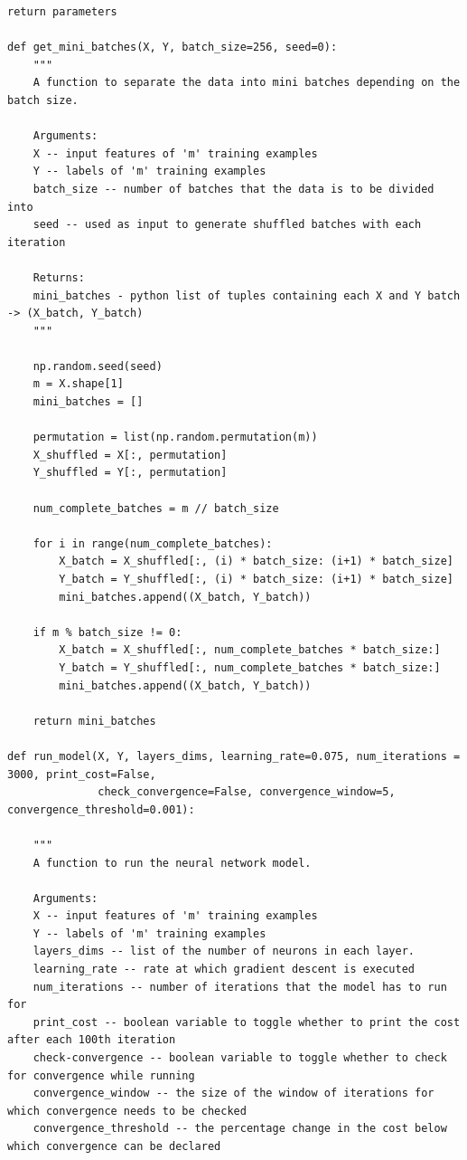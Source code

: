 \documentclass{article}
\begin{document}
\begin{lstlisting}[caption={Neural network functions - NN\_helper\_functions.py}]
    return parameters

def get_mini_batches(X, Y, batch_size=256, seed=0):
    """
    A function to separate the data into mini batches depending on the batch size.

    Arguments:
    X -- input features of 'm' training examples
    Y -- labels of 'm' training examples
    batch_size -- number of batches that the data is to be divided into
    seed -- used as input to generate shuffled batches with each iteration

    Returns:
    mini_batches - python list of tuples containing each X and Y batch -> (X_batch, Y_batch)
    """
    
    np.random.seed(seed)
    m = X.shape[1]
    mini_batches = []

    permutation = list(np.random.permutation(m))
    X_shuffled = X[:, permutation]
    Y_shuffled = Y[:, permutation]

    num_complete_batches = m // batch_size

    for i in range(num_complete_batches):
        X_batch = X_shuffled[:, (i) * batch_size: (i+1) * batch_size]
        Y_batch = Y_shuffled[:, (i) * batch_size: (i+1) * batch_size]
        mini_batches.append((X_batch, Y_batch))

    if m % batch_size != 0:
        X_batch = X_shuffled[:, num_complete_batches * batch_size:]
        Y_batch = Y_shuffled[:, num_complete_batches * batch_size:]
        mini_batches.append((X_batch, Y_batch))
    
    return mini_batches

def run_model(X, Y, layers_dims, learning_rate=0.075, num_iterations = 3000, print_cost=False,
              check_convergence=False, convergence_window=5, convergence_threshold=0.001):
    
    """
    A function to run the neural network model.

    Arguments:
    X -- input features of 'm' training examples
    Y -- labels of 'm' training examples
    layers_dims -- list of the number of neurons in each layer.
    learning_rate -- rate at which gradient descent is executed
    num_iterations -- number of iterations that the model has to run for
    print_cost -- boolean variable to toggle whether to print the cost after each 100th iteration
    check-convergence -- boolean variable to toggle whether to check for convergence while running
    convergence_window -- the size of the window of iterations for which convergence needs to be checked
    convergence_threshold -- the percentage change in the cost below which convergence can be declared


\end{lstlisting}
\end{document}
